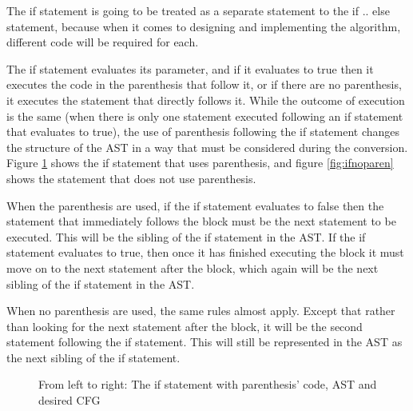 The if statement is going to be treated as a separate statement to the if .. else statement, because when it comes to designing and implementing the algorithm, different code will be required for each.

The if statement evaluates its parameter, and if it evaluates to true then it executes the code in the parenthesis that follow it, or if there are no parenthesis, it executes the statement that directly follows it. While the outcome of execution is the same (when there is only one statement executed following an if statement that evaluates to true), the use of parenthesis following the if statement changes the structure of the AST in a way that must be considered during the conversion. Figure \ref{fig:if} shows the if statement that uses parenthesis, and figure \ref{fig:ifnoparen} shows the statement that does not use parenthesis.

When the parenthesis are used, if the if statement evaluates to false then the statement that immediately follows the block must be the next statement to be executed. This will be the sibling of the if statement in the AST. If the if statement evaluates to true, then once it has finished executing the block it must move on to the next statement after the block, which again will be the next sibling of the if statement in the AST.

When no parenthesis are used, the same rules almost apply. Except that rather than looking for the next statement after the block, it will be the second statement following the if statement. This will still be represented in the AST as the next sibling of the if statement.
\begin{figure}
\centering
\begin{minipage}{.3\textwidth}
  \centering
  
\end{minipage}%
\begin{minipage}{.3\textwidth}
  \centering
\end{minipage}
\begin{minipage}{.3\textwidth}
  \centering
\end{minipage}
\caption{From left to right: The if statement with parenthesis' code, AST and desired CFG}
\label{fig:if}
\end{figure}

